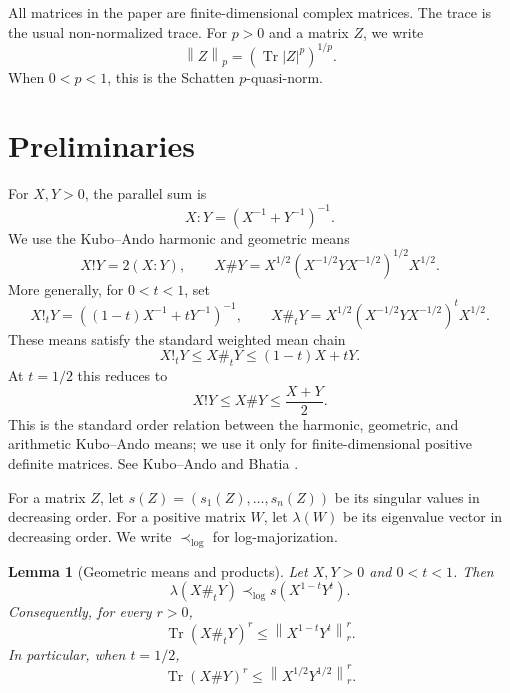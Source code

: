 \documentclass[11pt]{amsart}
\numberwithin{equation}{section}
\newtheorem{lemma}[theorem]{Lemma}
\newcommand{\Tr}{\operatorname{Tr}}
\newcommand{\norm}[1]{\left\lVert #1\right\rVert}
\begin{document}
All matrices in the paper are finite-dimensional complex matrices.  The trace is the usual non-normalized trace.  For \(p>0\) and a matrix \(Z\), we write
\[
    \norm{Z}_p=(\Tr |Z|^p)^{1/p}.
\]
When \(0<p<1\), this is the Schatten \(p\)-quasi-norm.

\section{Preliminaries}\label{sec:prelim}

For \(X,Y>0\), the parallel sum is
\[
    X:Y=(X^{-1}+Y^{-1})^{-1}.
\]
We use the Kubo--Ando harmonic and geometric means
\[
    X!Y=2(X:Y),\qquad
    X\#Y=X^{1/2}(X^{-1/2}YX^{-1/2})^{1/2}X^{1/2}.
\]
More generally, for \(0<t<1\), set
\[
    X!_tY=((1-t)X^{-1}+tY^{-1})^{-1},
    \qquad
    X\#_tY=X^{1/2}(X^{-1/2}YX^{-1/2})^tX^{1/2}.
\]
These means satisfy the standard weighted mean chain
\begin{equation}\label{eq:weighted-mean-chain}
    X!_tY\le X\#_tY\le (1-t)X+tY.
\end{equation}
At \(t=1/2\) this reduces to
\begin{equation}\label{eq:mean-chain}
    X!Y\le X\#Y\le \frac{X+Y}{2}.
\end{equation}
This is the standard order relation between the harmonic, geometric, and arithmetic Kubo--Ando means; we use it only for finite-dimensional positive definite matrices.  See Kubo--Ando \cite{KuboAndo1980} and Bhatia \cite{Bhatia2007}.

For a matrix \(Z\), let \(s(Z)=(s_1(Z),\ldots,s_n(Z))\) be its singular values in decreasing order.  For a positive matrix \(W\), let \(\lambda(W)\) be its eigenvalue vector in decreasing order.  We write \(\prec_{\log}\) for log-majorization.

\begin{lemma}[Geometric means and products]\label{lem:ando-hiai}
Let \(X,Y>0\) and \(0<t<1\).  Then
\begin{equation}\label{eq:AH-weighted}
    \lambda(X\#_tY)\prec_{\log}s(X^{1-t}Y^t).
\end{equation}
Consequently, for every \(r>0\),
\begin{equation}\label{eq:geomean-trace-bound-weighted}
    \Tr(X\#_tY)^r\le \norm{X^{1-t}Y^t}_r^r.
\end{equation}
In particular, when \(t=1/2\),
\begin{equation}\label{eq:geomean-trace-bound}
    \Tr(X\#Y)^r\le \norm{X^{1/2}Y^{1/2}}_r^r.
\end{equation}
\end{lemma}
\end{document}
